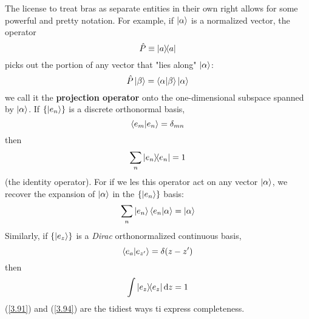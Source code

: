 The license to treat bras as separate entities in their own right allows for some powerful and pretty notation. For example, if $\ket{\alpha}$ is a normalized vector, the operator
\begin{equation}\label{3.89}
	\hat{P}\equiv \op{a}{a} 
\end{equation}
picks out the portion of any vector that "lies along" $\ket{\alpha}$: $$\hat{P}\ket{\beta}=\braket{\alpha}{\beta}\ket{\alpha}$$ we call it the \textbf{projection operator} onto the one-dimensional subspace spanned by $\ket{\alpha}$. If $\{\ket{e_n}\}$ is a discrete orthonormal basis,
\begin{equation}\label{3.90}
	\braket{e_m}{e_n}=\delta_{mn}
\end{equation}
then 
\begin{equation}\label{3.91}
	\sum_n\op{e_n}{e_n}=1
\end{equation}
(the identity operator). For if we les this operator act on any vector $\ket{\alpha}$, we recover the expansion of $\ket{\alpha}$ in the $\{\ket{e_n}\}$ basis:
\begin{equation}\label{3.92}
	\sum_n\ket{e_n}\braket{e_n}{\alpha}=\ket{\alpha}
\end{equation}
Similarly, if $\{\ket{e_z}\}$ is a \textit{Dirac} orthonormalized continuous basis,
\begin{equation}\label{3.93}
	\braket{e_a}{e_{z'}}=\delta(z-z')
\end{equation}
then
\begin{equation}\label{3.94}
	\int\op{e_z}{e_z}\dd z=1
\end{equation}
(\ref{3.91}) and (\ref{3.94}) are the tidiest ways ti express completeness.



































